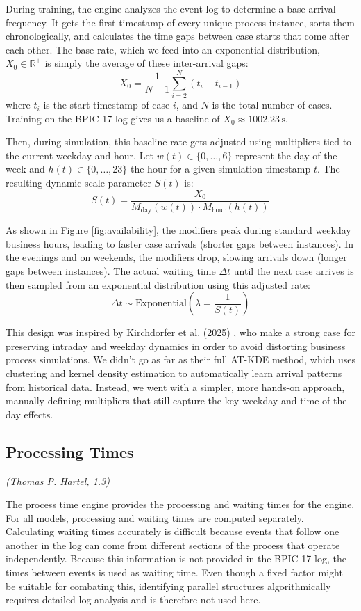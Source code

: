 \documentclass[
  english,
  font=times,
  twocolumn,
]{tumarticle}
\begin{document}
During training, the engine analyzes the event log to determine a base arrival frequency. It gets the first timestamp of every unique process instance, sorts them chronologically, and calculates the time gaps between case starts that come after each other. The base rate, which we feed into an exponential distribution, $X_0 \in \mathbb{R}^+$ is simply the average of these inter-arrival gaps:
$$X_0 = \frac{1}{N-1} \sum_{i=2}^{N} (t_i - t_{i-1})$$
where $t_i$ is the start timestamp of case $i$, and $N$ is the total number of cases. Training on the BPIC-17 log gives us a baseline of $X_0 \approx 1002.23\,\text{s}$.

Then, during simulation, this baseline rate gets adjusted using multipliers tied to the current weekday and hour. Let $w(t) \in \{0, \dots, 6\}$ represent the day of the week and $h(t) \in \{0, \dots, 23\}$ the hour for a given simulation timestamp $t$. The resulting dynamic scale parameter $S(t)$ is:
$$S(t) = \frac{X_0}{M_{\text{day}}(w(t)) \cdot M_{\text{hour}}(h(t))}$$

As shown in Figure \ref{fig:availability}, the modifiers peak during standard weekday business hours, leading to faster case arrivals (shorter gaps between instances). In the evenings and on weekends, the modifiers drop, slowing arrivals down (longer gaps between instances). The actual waiting time $\Delta t$ until the next case arrives is then sampled from an exponential distribution using this adjusted rate:
$$\Delta t \sim \text{Exponential}\left(\lambda = \frac{1}{S(t)}\right)$$

This design was inspired by Kirchdorfer et al. (2025) \cite{kirchdorfer2025divide}, who make a strong case for preserving intraday and weekday dynamics in order to avoid distorting business process simulations. We didn't go as far as their full AT-KDE method, which uses clustering and kernel density estimation to automatically learn arrival patterns from historical data. Instead, we went with a simpler, more hands-on approach, manually defining multipliers that still capture the key weekday and time of the day effects.

\subsection{Processing Times}
\textit{(Thomas P. Hartel, 1.3)}\quad

The process time engine provides the processing and waiting times for the engine.
For all models, processing and waiting times are computed separately. Calculating waiting times accurately is difficult because events that follow one another in the log can come from different sections of the process that operate independently. Because this information is not provided in the BPIC-17 log, the times between events is used as waiting time. Even though a fixed factor might be suitable for combating this, identifying parallel structures algorithmically requires detailed log analysis and is therefore not used here.
\end{document}
